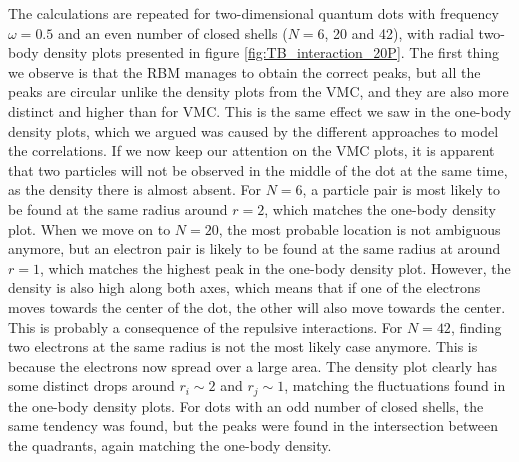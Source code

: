 The calculations are repeated for two-dimensional quantum dots with frequency $\omega=0.5$ and an even number of closed shells ($N=6$, 20 and 42), with radial two-body density plots presented in figure \eqref{fig:TB_interaction_20P}. The first thing we observe is that the RBM manages to obtain the correct peaks, but all the peaks are circular unlike the density plots from the VMC, and they are also more distinct and higher than for VMC. This is the same effect we saw in the one-body density plots, which we argued was caused by the different approaches to model the correlations. If we now keep our attention on the VMC plots, it is apparent that two particles will not be observed in the middle of the dot at the same time, as the density there is almost absent. For $N=6$, a particle pair is most likely to be found at the same radius around $r=2$, which matches the one-body density plot. When we move on to $N=20$, the most probable location is not ambiguous anymore, but an electron pair is likely to be found at the same radius at around $r=1$, which matches the highest peak in the one-body density plot. However, the density is also high along both axes, which means that if one of the electrons moves towards the center of the dot, the other will also move towards the center. This is probably a consequence of the repulsive interactions. For $N=42$, finding two electrons at the same radius is not the most likely case anymore. This is because the electrons now spread over a large area. The density plot clearly has some distinct drops around $r_i\sim 2$ and $r_j\sim 1$, matching the fluctuations found in the one-body density plots. For dots with an odd number of closed shells, the same tendency was found, but the peaks were found in the intersection between the quadrants, again matching the one-body density. 

